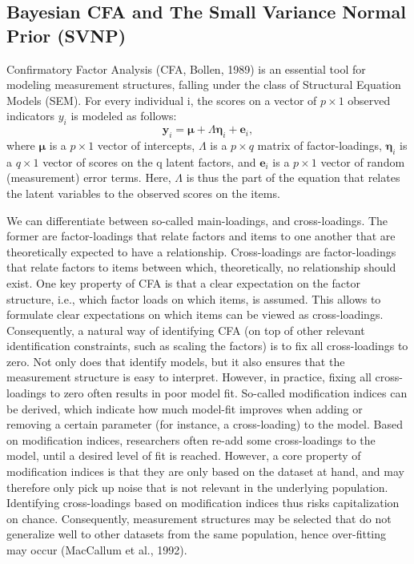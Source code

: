 \documentclass[
  man, donotrepeattitle,floatsintext]{apa6}
\begin{document}
\hypertarget{bayesian-cfa-and-the-small-variance-normal-prior-svnp}{%
\subsection{Bayesian CFA and The Small Variance Normal Prior (SVNP)}\label{bayesian-cfa-and-the-small-variance-normal-prior-svnp}}

Confirmatory Factor Analysis (CFA, Bollen, 1989) is an essential tool for modeling measurement structures, falling under the class of Structural Equation Models (SEM). For every individual i, the scores on a vector of \(p \times 1\) observed indicators \(y_i\) is modeled as follows:
\[\boldsymbol{y}_i = \boldsymbol{\mu} + \Lambda \boldsymbol{\eta}_i + \boldsymbol{e}_i ,\]
where \(\boldsymbol{\mu}\) is a \(p \times 1\) vector of intercepts, \(\Lambda\) is a \(p \times q\) matrix of factor-loadings, \(\boldsymbol{\eta}_i\) is a \(q \times 1\) vector of scores on the q latent factors, and \(\boldsymbol{e}_i\) is a \(p \times 1\) vector of random (measurement) error terms. Here, \(\Lambda\) is thus the part of the equation that relates the latent variables to the observed scores on the items.

We can differentiate between so-called main-loadings, and cross-loadings. The former are factor-loadings that relate factors and items to one another that are theoretically expected to have a relationship. Cross-loadings are factor-loadings that relate factors to items between which, theoretically, no relationship should exist. One key property of CFA is that a clear expectation on the factor structure, i.e., which factor loads on which items, is assumed. This allows to formulate clear expectations on which items can be viewed as cross-loadings. Consequently, a natural way of identifying CFA (on top of other relevant identification constraints, such as scaling the factors) is to fix all cross-loadings to zero. Not only does that identify models, but it also ensures that the measurement structure is easy to interpret. However, in practice, fixing all cross-loadings to zero often results in poor model fit. So-called modification indices can be derived, which indicate how much model-fit improves when adding or removing a certain parameter (for instance, a cross-loading) to the model. Based on modification indices, researchers often re-add some cross-loadings to the model, until a desired level of fit is reached. However, a core property of modification indices is that they are only based on the dataset at hand, and may therefore only pick up noise that is not relevant in the underlying population. Identifying cross-loadings based on modification indices thus risks capitalization on chance. Consequently, measurement structures may be selected that do not generalize well to other datasets from the same population, hence over-fitting may occur (MacCallum et al., 1992).
\end{document}
